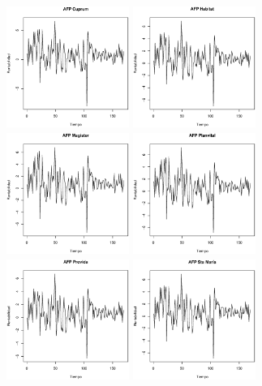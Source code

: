 \begin{figure}[!ht]
\begin{center}
\centering
  \includegraphics[height=4cm, width=4cm]{afp1.eps}
  \includegraphics[height=4cm, width=4cm]{afp2.eps}
  \includegraphics[height=4cm, width=4cm]{afp3.eps}
  \includegraphics[height=4cm, width=4cm]{afp4.eps}\\
  \includegraphics[height=4cm, width=4cm]{afp5.eps}
  \includegraphics[height=4cm, width=4cm]{afp6.eps}

\end{center}
\end{figure}
